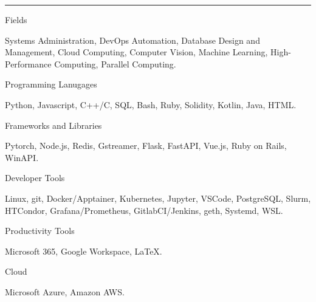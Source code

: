 \documentclass[a4paper,9pt]{article}
\newlength{\cvcolumngapwidth}
\newlength{\cvleftcolumnwidth}
\newlength{\cvrightcolumnwidth}
\newcommand{\cvsectionstyle}[1]{{\normalsize\cvsectionfont\textcolor{cvsectioncolor}{#1}}}
\newcommand{\cvheadingstyle}[1]{{\normalsize\cvheadingfont\textcolor{cvheadingcolor}{#1}}}
\newlength{\cvafteritemskipamount}
\newlength{\cvaftersectionskipamount}
\newlength{\cvbetweensectionandheadingextraskipamount}
\newlength{\cvparskip}
\newcommand{\cvsection}[1]{
    \begin{minipage}[t]{\cvleftcolumnwidth}
        \raggedleft\cvsectionstyle{#1}
    \end{minipage}%
    \hspace{\cvcolumngapwidth}%
    \begin{minipage}[t]{\cvrightcolumnwidth}
        \textcolor{cvrulecolor}{\rule{\cvrightcolumnwidth}{0.3mm}}
    \end{minipage}

    \vspace{\cvaftersectionskipamount}
}
\newcommand{\cvitem}[2]{
    \begin{minipage}[t]{\cvleftcolumnwidth}
        \raggedleft #1
    \end{minipage}%
    \hspace{\cvcolumngapwidth}%
    \begin{minipage}[t]{\cvrightcolumnwidth}
        \setlength{\parskip}{\cvparskip} #2
    \end{minipage}

    \vspace{\cvafteritemskipamount}
}
\begin{document}

\cvsection{SKILLS}

\vspace{\cvbetweensectionandheadingextraskipamount}

\cvitem{
    \cvheadingstyle{Fields}
}{
    Systems Administration, DevOps Automation, Database Design and Management, Cloud Computing, Computer Vision, Machine Learning, High-Performance Computing, Parallel Computing.
}

\cvitem{
    \cvheadingstyle{Programming Lanugages}
}{
    Python, Javascript, C++/C, SQL, Bash, Ruby, Solidity, Kotlin, Java, HTML.
}

\cvitem{
    \cvheadingstyle{Frameworks and Libraries}
}{
    Pytorch, Node.js, Redis, Gstreamer, Flask, FastAPI, Vue.js, Ruby on Rails, WinAPI.
}

\cvitem{
    \cvheadingstyle{Developer Tools}
}{
    Linux, git, Docker/Apptainer, Kubernetes, Jupyter, VSCode, PostgreSQL, Slurm, HTCondor, Grafana/Prometheus, GitlabCI/Jenkins, geth, Systemd, WSL.
}

\cvitem{
    \cvheadingstyle{Productivity Tools}
}{
    Microsoft 365, Google Workspace, \LaTeX.
}

\cvitem{
    \cvheadingstyle{Cloud}
}{
    Microsoft Azure, Amazon AWS.
}




    
    
\end{document}
